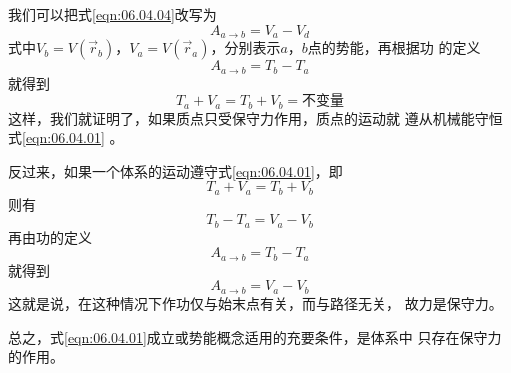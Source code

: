 我们可以把式\eqref{eqn:06.04.04}改写为
\begin{equation}\label{eqn:06.04.05}
    A _ { a \to b } = V _ { a } - V _ { d }
\end{equation}
式中$ V _ { b } = V \left( \vec{ r } _ { b } \right) $，$  V _ { a } = V \left( \vec{ r } _ { a } \right) $，分别表示$ a $，$ b $点的势能，再根据功
的定义
\begin{equation}\label{eqn:06.04.06}
    A _ { a \to b } = T _ { b } - T _ { a }
\end{equation}
就得到
\begin{equation}\label{eqn:06.04.07}
    T _ { a } + V _ { a } = T _ { b } + V _ { b } =  \text{不变量}
\end{equation}
这样，我们就证明了，如果质点只受保守力作用，质点的运动就
遵从机械能守恒\lhbrak 式\eqref{eqn:06.04.01} \rhbrak 。

\clearpage
反过来，如果一个体系的运动遵守式\eqref{eqn:06.04.01}，即
\begin{equation*}
    T _ { a } + V _ { a } = T _ { b } + V _ { b }
\end{equation*}
则有
\begin{equation*}
    T _ { b } - T _ { a } = V _ { a } - V _ { b }
\end{equation*}
再由功的定义
\begin{equation*}
    A _ { a \to b } = T _ { b } - T _ { a }
\end{equation*}
就得到
\begin{equation*}
    A _ { a \to b } = V _ { a } - V _ { b }
\end{equation*}
这就是说，在这种情况下作功仅与始末点有关，而与路径无关，
故力是保守力。

总之，式\eqref{eqn:06.04.01}成立或势能概念适用的充要条件，是体系中
只存在保守力的作用。